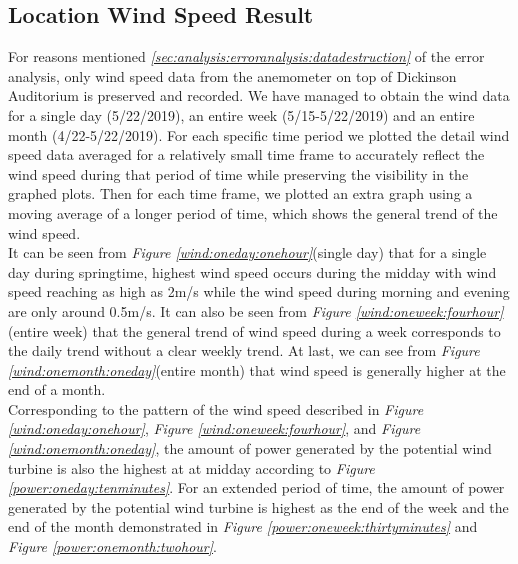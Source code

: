 \documentclass[review]{elsarticle}
\begin{document}
\clearpage
\subsection{Location Wind Speed Result}
\label{sec:results:locwindspeedresults}
For reasons mentioned \textit{\ref{sec:analysis:erroranalysis:datadestruction}}  of the error analysis, only wind speed data from the 
anemometer on top of Dickinson Auditorium is preserved and recorded. We have managed to obtain the wind data for a single day (5/22/2019), 
an entire week (5/15-5/22/2019) and an entire month (4/22-5/22/2019). For each specific time period we plotted the detail wind speed data 
averaged for a relatively small time frame to accurately reflect the wind speed during that period of time while preserving the visibility 
in the graphed plots. Then for each time frame, we plotted an extra graph using a moving average of a longer period of time, which shows 
the general trend of the wind speed.
\\\indent It can be seen from \textit{Figure \ref{wind:oneday:onehour}}(single day) that for a single day during springtime, highest wind 
speed occurs during the midday with wind speed reaching as high as 2m/s while the wind speed during morning and evening are only around 0.5m/s. 
It can also be seen from \textit{Figure \ref{wind:oneweek:fourhour}}(entire week) that the general trend of wind speed during a week corresponds 
to the daily trend without a clear weekly trend. At last, we can see from \textit{Figure \ref{wind:onemonth:oneday}}(entire month) that wind speed is generally 
higher at the end of a month.
\\\indent Corresponding to the pattern of the wind speed described in \textit{Figure \ref{wind:oneday:onehour}}, \textit{Figure \ref{wind:oneweek:fourhour}}, 
and \textit{Figure \ref{wind:onemonth:oneday}}, the amount of power generated by the potential wind turbine is also the highest at at midday 
according to \textit{Figure \ref{power:oneday:tenminutes}}. For an extended period of time, the amount of power generated by the potential 
wind turbine is highest as the end of the week and the end of the month demonstrated in \textit{Figure \ref{power:oneweek:thirtyminutes}} and \textit{Figure \ref{power:onemonth:twohour}}.

\clearpage

\end{document}
